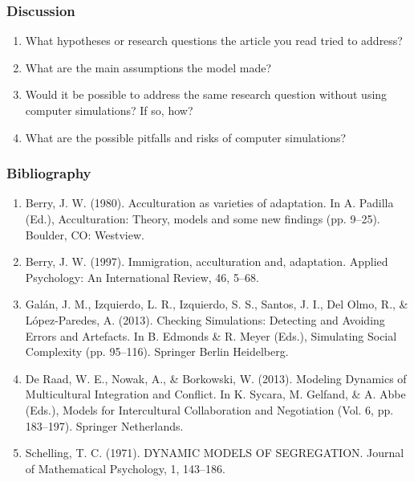 \documentclass[aspectratio=169]{beamer}
\begin{document}
\begin{frame}
   \frametitle{Discussion}
   \begin{enumerate}
      \item What hypotheses or research questions the article you read tried to address?
      \item What are the main assumptions the model made?
      \item Would it be possible to address the same research question without using computer simulations? If so, how?
      \item What are the possible pitfalls and risks of computer simulations?
   \end{enumerate}
\end{frame}
\begin{frame}
   \frametitle{Bibliography}
   \scriptsize
   \begin{enumerate}
      \item Berry, J. W. (1980). Acculturation as varieties of adaptation. In A. Padilla (Ed.), Acculturation: Theory, models and some new findings (pp. 9–25). Boulder, CO: Westview.
      \item Berry, J. W. (1997). Immigration, acculturation and, adaptation. Applied Psychology: An International Review, 46, 5–68.
      \item Galán, J. M., Izquierdo, L. R., Izquierdo, S. S., Santos, J. I., Del
      Olmo, R., \& López-Paredes, A. (2013). Checking Simulations: Detecting and
      Avoiding Errors and Artefacts. In B. Edmonds \& R. Meyer (Eds.),
      Simulating Social Complexity (pp. 95–116). Springer Berlin Heidelberg.
      \item De Raad, W. E., Nowak, A., \& Borkowski, W. (2013). Modeling
      Dynamics of Multicultural Integration and Conflict. In K. Sycara, M.
      Gelfand, \& A. Abbe (Eds.), Models for Intercultural Collaboration and
      Negotiation (Vol. 6, pp. 183–197). Springer Netherlands.
      \item Schelling, T. C. (1971). DYNAMIC MODELS OF SEGREGATION. Journal of
      Mathematical Psychology, 1, 143–186.
   \end{enumerate}
\end{frame}
\end{document}
